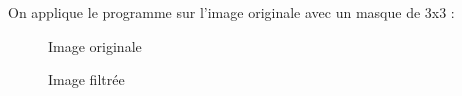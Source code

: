 \documentclass[french,a4paper,10pt]{article}
\begin{document}
    On applique le programme sur l'image originale avec un masque de 3x3 : %
    \begin{figure}[!htb]
        \begin{minipage}{0.48\textwidth}
            \centering
            \caption{Image originale}\label{Fig:peppers-grey-2}
        \end{minipage}\hfill
        \begin{minipage}{0.48\textwidth}
            \centering
            \caption{Image filtrée}\label{Fig:filtre-gaussien-peppers-grey}
        \end{minipage}
    \end{figure}
\end{document}
